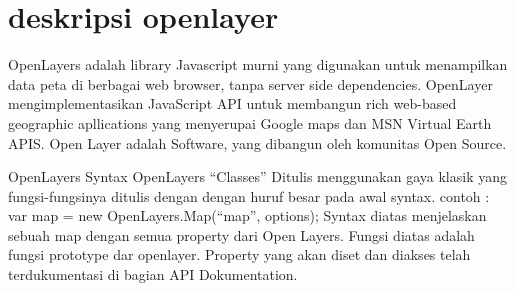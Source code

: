 
\section{deskripsi openlayer}
  OpenLayers adalah library Javascript murni yang digunakan untuk menampilkan data peta di berbagai web browser, tanpa server side dependencies.
  OpenLayer mengimplementasikan JavaScript API untuk membangun rich web-based geographic apllications yang menyerupai Google maps dan MSN Virtual Earth APIS.
  Open Layer adalah Software, yang dibangun oleh komunitas Open Source.
  
  OpenLayers Syntax
  OpenLayers “Classes”
  Ditulis menggunakan gaya klasik yang fungsi-fungsinya ditulis dengan dengan huruf besar pada awal syntax.
  contoh : var map = new OpenLayers.Map(“map”, options);
  Syntax diatas menjelaskan sebuah map dengan semua property dari Open Layers.
  Fungsi diatas adalah fungsi prototype dar openlayer. Property yang akan diset dan diakses telah terdukumentasi di bagian API   Dokumentation.
